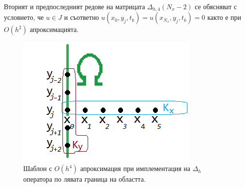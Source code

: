 \documentclass{article}
\begin{document}
Вторият и предпоследният редове на матрицата $\Delta_{h,4}(N_x-2)$ се обясняват с условието, че $u \in J$ и съответно $u(x_0, y_j, t_k) = u(x_{N_x}, y_j, t_k) = 0$ както е при $O(h^2)$ апроксимацията. 

\begin{figure}%
     \begin{center}
     \includegraphics[scale=.5]{LeftBoundary.png}
     \end{center}
	\caption{Шаблон с $O(h^4)$ апроксимация при имплементация на $\Delta_h$ оператора по лявата граница на областта.}
	\label{fig:LeftBoundary}
\end{figure}
\end{document}
